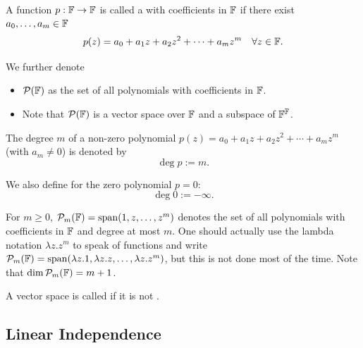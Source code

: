 \begin{mydef}
  A function $p: \mathbb{F} \to \mathbb{F}$ is called a  with coefficients in $\mathbb{F}$ if there exist $a_0, \ldots, a_m \in \mathbb{F}$ \st
  \begin{equation}
    p(z)=a_0 + a_1z + a_2z^2 + \cdots + a_m z^m \quad \forall z \in \mathbb{F}.
  \end{equation}

  We further denote
  \begin{itemize}
    \item $\mathcal{P} (\mathbb{F})$ as the set of all polynomials with coefficients in $\mathbb{F}$.
    \item Note that $\mathcal{P} (\mathbb{F})$ is a vector space over $\mathbb{F}$ and a subspace of $\mathbb{F}^{\mathbb{F}}$.
  \end{itemize}
\end{mydef}

\begin{mydef}
  The degree $m$ of a non-zero polynomial $p(z)=a_0+a_1z+a_2z^2+\cdots+a_mz^m$ (with $a_m \neq 0$) is denoted by
  \begin{equation}
    \deg p := m.
  \end{equation}

  We also define for the zero polynomial $p=0$:
  \begin{equation}
    \deg 0 := -\infty.
  \end{equation}
\end{mydef}

\begin{mydef} 
  For $m \ge 0$, $\mathcal{P}_m (\mathbb{F} )=\operatorname{span} (1,z,\dots,z^m)$ denotes the set of all polynomials with coefficients in $\mathbb{F}$ and degree at most $m$. One should actually use the lambda notation $\lambda z.z^m$ to speak of functions and write $\mathcal{P}_m (\mathbb{F} )=\operatorname{span} (\lambda z.1,\lambda z.z,\dots,\lambda z.z^m)$, but this is not done most of the time. Note that $\dim \mathcal{P}_m(\mathbb{F}) = m+1$.
\end{mydef}

\setcounter{thm}{12}
\begin{mydef}
  A vector space is called  if it is not \fd.
\end{mydef}


\subsection{Linear Independence}


